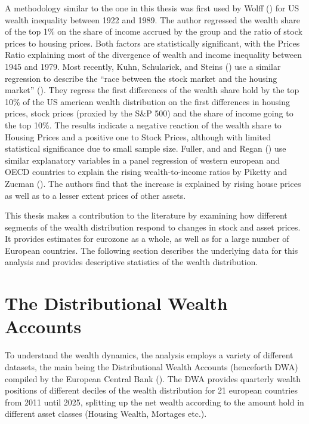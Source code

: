 \documentclass[
  a4paper,
  DIV=11,
  numbers=noendperiod]{scrartcl}
\begin{document}
A methodology similar to the one in this thesis was first used by Wolff
() for US wealth
inequality between 1922 and 1989. The author regressed the wealth share
of the top 1\% on the share of income accrued by the group and the ratio
of stock prices to housing prices. Both factors are statistically
significant, with the Prices Ratio explaining most of the divergence of
wealth and income inequality between 1945 and 1979. Most recently, Kuhn,
Schularick, and Steins
() use a similar
regression to describe the ``race between the stock market and the
housing market'' (). They regress the first differences of the wealth share hold by the
top 10\% of the US american wealth distribution on the first differences
in housing prices, stock prices (proxied by the S\&P 500) and the share
of income going to the top 10\%. The results indicate a negative
reaction of the wealth share to Housing Prices and a positive one to
Stock Prices, although with limited statistical significance due to
small sample size. Fuller, and and Regan
() use similar
explanatory variables in a panel regression of western european and OECD
countries to explain the rising wealth-to-income ratios by Piketty and
Zucman (). The
authors find that the increase is explained by rising house prices as
well as to a lesser extent prices of other assets.

This thesis makes a contribution to the literature by examining how
different segments of the wealth distribution respond to changes in
stock and asset prices. It provides estimates for eurozone as a whole,
as well as for a large number of European countries. The following
section describes the underlying data for this analysis and provides
descriptive statistics of the wealth distribution.

\section{The Distributional Wealth Accounts}\label{sec-data}

To understand the wealth dynamics, the analysis employs a variety of
different datasets, the main being the Distributional Wealth Accounts
(henceforth DWA) compiled by the European Central Bank
(). The DWA provides quarterly wealth positions of different
deciles of the wealth distribution for 21 european countries from 2011
until 2025, splitting up the net wealth according to the amount hold in
different asset classes (Housing Wealth, Mortages etc.).
\end{document}
